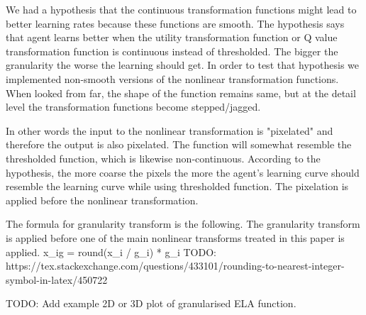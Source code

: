 

We had a hypothesis that the continuous transformation functions might lead to better learning rates because these functions are smooth. The hypothesis says that agent learns better when the utility transformation function or Q value transformation function is continuous instead of thresholded. The bigger the granularity the worse the learning should get. In order to test that hypothesis we implemented non-smooth versions of the nonlinear transformation functions. When looked from far, the shape of the function remains same, but at the detail level the transformation functions become stepped/jagged.

In other words the input to the nonlinear transformation is "pixelated" and therefore the output is also pixelated. The function will somewhat resemble the thresholded function, which is likewise non-continuous. According to the hypothesis, the more coarse the pixels the more the agent's learning curve should resemble the learning curve while using thresholded function. The pixelation is applied before the nonlinear transformation.

The formula for granularity transform is the following. The granularity transform is applied before one of the main nonlinear transforms treated in this paper is applied.
x_ig = round(x_i / g_i) * g_i
TODO: https://tex.stackexchange.com/questions/433101/rounding-to-nearest-integer-symbol-in-latex/450722

TODO: Add example 2D or 3D plot of granularised ELA function.



